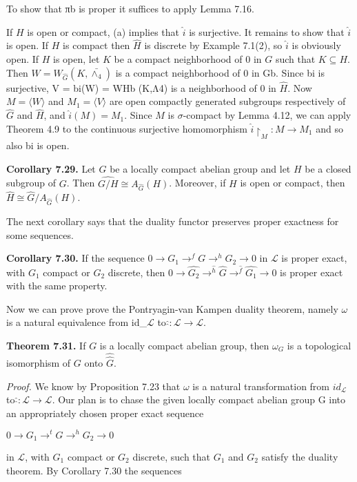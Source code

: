 \documentclass[12pt]{article}
\begin{document}
\begin{itemize}
\begin{itemize}
    To show that πb is proper it suffices to apply Lemma 7.16.


    If $H$ is open or compact, (a) implies that $\hat{i}$ is surjective. It remains to show that $\hat{i}$ is open. If $H$ is compact
then $\hat{H}$ is discrete by Example 7.1(2), so $\hat{i}$ is obviously open. If $H$ is open, let $K$ be a compact neighborhood
of 0 in $G$ such that $K \subseteq H$. Then $W = W_{\hat{G}}(K,\bar{\wedge_4})$ is a compact neighborhood of 0 in Gb. Since bi is surjective,
V = bi(W) = WHb (K,Λ4) is a neighborhood of 0 in $\hat{H}$. Now $M = \langle W \rangle$ and $M_1 = \langle V \rangle$ are open compactly
generated subgroups respectively of $\hat{G}$ and $\hat{H}$, and $\hat{i}(M) = M_1$. Since $M$ is $\sigma$-compact by Lemma 4.12, we can
apply Theorem 4.9 to the continuous surjective homomorphism $\hat{i} \upharpoonright_M: M \to M_1$ and so also bi is open.

 
\textbf{Corollary 7.29.} Let $G$ be a locally compact abelian group and let $H$ be a closed subgroup of $G$. Then
$\hat{G/H} \cong A_{\hat{G}}(H)$. Moreover, if $H$ is open or compact, then $\hat{H} \cong \hat{G}/A_{\hat{G}}(H)$.


    The next corollary says that the duality functor preserves proper exactness for some sequences.


\textbf{Corollary 7.30.} If the sequence $0 \to G_1 \to^f G \to^h G_2 → 0$ in $\mathcal{L}$ is proper exact, with $G_1$ compact or $G_2$ discrete,
then $0 \to \hat{G_2} \to^{\hat{h}} \hat{G} \to^{\hat{f}} \hat{G_1} \to 0$ is proper exact with the same property.


    Now we can prove prove the Pontryagin-van Kampen duality theorem, namely $\omega$ is a natural equivalence
from id_$\mathcal{L}$ to $\hat{\hat{}}: \mathcal{L} \to \mathcal{L}$.



\textbf{Theorem 7.31.} If $G$ is a locally compact abelian group, then $\omega_G$ is a topological isomorphism of $G$ onto $\hat{\hat{G}}$.


\emph{Proof.} We know by Proposition 7.23 that $\omega$ is a natural transformation from $id_\mathcal{L}$ to $\hat{\hat{}}: \mathcal{L} \to \mathcal{L}$. Our plan is to
chase the given locally compact abelian group G into an appropriately chosen proper exact sequence


    $0 \to G_1 \to^t G \to^h G_2 \to 0$


in $\mathcal{L}$, with $G_1$ compact or $G_2$ discrete, such that $G_1$ and $G_2$ satisfy the duality theorem. By Corollary 7.30 the
sequences



\end{itemize}
\end{itemize}
\end{document}
